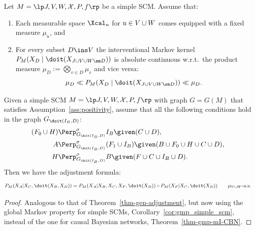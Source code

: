 \begin{Ass}\label{ass:positivity}
  Let $M = \lt \Sin, \Send, \Srnd, \CX, P, f \rt$ be a simple SCM.
  Assume that:
  \begin{enumerate}
    \item Each measurable space $\Xcal_u$ for $u \in V \cup W$ comes equipped with a fixed measure $\mu_u$, and
    \item For every subset $D \ins \Send$ the interventional Markov kernel $P_M(X_D \mid \doit(X_{J \cup V \cup W \sm D}))$ is
      absolute continuous w.r.t.\ the product measure $\mu_D:=\bigotimes_{v \in D} \mu_v$ and vice versa:
            \[ \mu_D \ll P_M(X_D \mid \doit(X_{J \cup V \cup W \sm D})) \ll \mu_D. \]
  \end{enumerate}
\end{Ass}
\begin{Thm}\label{thm:gen-adjustment-scms}
Given a simple SCM $M = \lt \Sin, \Send, \Srnd, \CX, P, f \rt$ with graph $G = G(M)$ that satisfies Assumption~\ref{ass:positivity},
assume that all the following conditions hold in the graph $G_{\doit(I_B,D)}$: %
    \begin{align}
        (F_0 \cup H) & \Perp^\sigma_{G_{\doit(I_B,D)}} I_B \given (C \cup D), \\
        A & \Perp^\sigma_{G_{\doit(I_B,D)}} (F_1 \cup I_B) \given (B \cup F_0 \cup H \cup C \cup D), \\
                      H &\Perp^\sigma_{G_{\doit(I_B,D)}} B \given (F \cup C \cup  I_B \cup D).
    \end{align}
Then we have the adjustment formula:
\[ P_{M}(X_A|X_C,\doit(X_B,X_D)) = 
    P_{M}(X_A|X_B,X_C,X_F,\doit(X_D)) \circ P_{M}(X_F|X_C,\doit(X_D)) \qquad \text{$\mu_{V\cup W}$-a.s.}
\]
\end{Thm}
\begin{proof}
  Analogous to that of Theorem~\ref{thm-gen-adjustment}, but now using
  the global Markov property for simple SCMs, Corollary~\ref{cor:gmp_simple_scm}, 
  instead of the one for causal Bayesian networks, Theorem~\ref{thm-gmp-mI-CBN}. 
\end{proof}

